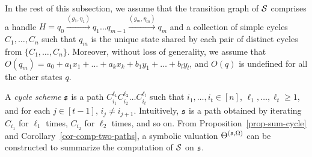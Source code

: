 In the rest of this subsection, we assume that the transition graph of ${\mathcal{S} }$ comprises a handle $H=q_0 \xrightarrow{(g_1,\eta_1)} q_1 \dots q_{m-1} \xrightarrow{(g_m,\eta_m)} q_{m}$ and a collection of simple cycles $C_1,\dots,C_n$ such that $q_m$ is the unique state shared by each pair of distinct cycles from $\{C_1,\dots,C_n\}$. Moreover, without loss of generality, we assume that $O(q_m) = a_0 + a_1 x_1 + \dots + a_k x_k + b_1 y_1 + \dots + b_l y_l$, and $O(q)$ is undefined for all the other states $q$.

A \emph{cycle scheme} ${\mathfrak{s} }$ is a path $C_{i_1}^{\ell_1} C_{i_2}^{\ell_2} \dots C_{i_t}^{\ell_t}$ such that $i_1,\dots,i_t \in [n]$, $\ell_1,\dots, \ell_t \ge 1$, and for each $j\in [t-1]$, $i_j \neq i_{j+1}$. Intuitively, ${\mathfrak{s} }$ is a path obtained by iterating $C_{i_1}$ for $\ell_1$ times, $C_{i_2}$ for $\ell_2$ times, and so on. From Proposition~\ref{prop-sum-cycle} and Corollary~\ref{cor-comp-two-paths}, a symbolic valuation $\Theta^{({\mathfrak{s} },\Omega)}$ can be constructed 
to summarize the computation of ${\mathcal{S} }$ on ${\mathfrak{s} }$. 


